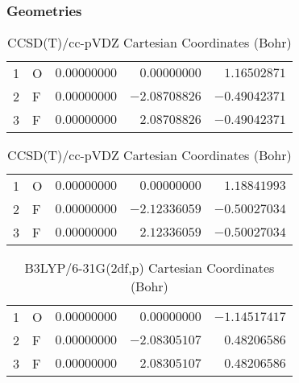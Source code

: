 \documentclass[10pt,oneside]{article}
\begin{document}
\begin{table}[h!]
\subsubsection*{Geometries}
\begin{multicols}{2}
\centering
\caption{CCSD(T)/cc-pVTZ Cartesian Coordinates (Bohr)}
\begin{tabular}{llrrr}
\toprule
1  & O  & $ 0.00000000$ & $ 0.00000000$ & $ 1.16502871$ \\
2  & F  & $ 0.00000000$ & $-2.08708826$ & $-0.49042371$ \\
3  & F  & $ 0.00000000$ & $ 2.08708826$ & $-0.49042371$ \\
\bottomrule
\end{tabular}
\caption{CCSD(T)/cc-pVDZ Cartesian Coordinates (Bohr)}
\begin{tabular}{llrrr}
\toprule
1  & O  & $ 0.00000000$ & $ 0.00000000$ & $ 1.18841993$ \\
2  & F  & $ 0.00000000$ & $-2.12336059$ & $-0.50027034$ \\
3  & F  & $ 0.00000000$ & $ 2.12336059$ & $-0.50027034$ \\
\bottomrule
\end{tabular}
\end{multicols}
\end{table}

\begin{table}[h]
\centering
\caption{B3LYP/6-31G(2df,p) Cartesian Coordinates (Bohr)}
\begin{tabular}{llrrr}
\toprule
1  & O  & $ 0.00000000$ & $ 0.00000000$ & $-1.14517417$ \\
2  & F  & $ 0.00000000$ & $-2.08305107$ & $ 0.48206586$ \\
3  & F  & $ 0.00000000$ & $ 2.08305107$ & $ 0.48206586$ \\
\bottomrule
\end{tabular}
\end{table}
\end{document}
